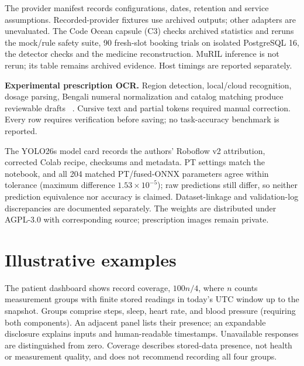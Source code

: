 \documentclass[preprint,12pt,a4paper]{elsarticle}
\begin{document}

The provider manifest records configurations, dates, retention and service assumptions.
Recorded-provider fixtures use archived outputs; other adapters are unevaluated. The Code
Ocean capsule (C3) checks archived statistics and reruns the mock/rule safety suite, 90
fresh-slot booking trials on isolated PostgreSQL 16, the detector checks and the medicine
reconstruction. MuRIL inference is not rerun; its table remains archived evidence.
Host timings are reported separately.
%

\textbf{Experimental prescription OCR.} Region detection, local/cloud recognition, dosage
parsing, Bengali numeral normalization and catalog matching produce reviewable drafts
~\cite{du2020,prescriptionocr}. Cursive text and partial tokens required manual correction.
Every row requires verification before saving; no task-accuracy benchmark is reported.

The YOLO26s model card records the authors' Roboflow v2 attribution, corrected Colab
recipe, checksums and metadata. PT settings match the notebook, and all 204 matched
PT/fused-ONNX parameters agree within tolerance (maximum difference $1.53\times10^{-5}$);
raw predictions still differ, so neither prediction equivalence nor accuracy is claimed.
Dataset-linkage and validation-log discrepancies are documented separately. The weights
are distributed under AGPL-3.0 with corresponding source; prescription images remain private.

\section{Illustrative examples}

The patient dashboard shows record coverage, $100n/4$, where $n$ counts measurement
groups with finite stored readings in today's UTC window up to the snapshot. Groups
comprise steps, sleep, heart rate, and blood pressure (requiring both components).
An adjacent panel lists their presence; an expandable disclosure explains inputs and
human-readable timestamps. Unavailable responses are distinguished from zero.
Coverage describes stored-data presence, not health or measurement quality, and does not
recommend recording all four groups.
\end{document}
